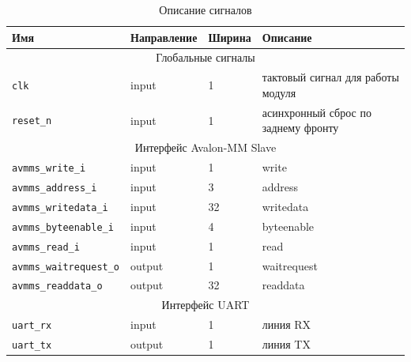 \documentclass[a4paper,12pt]{article}
\begin{document}
    \begin{table}
        \caption{Описание сигналов}
        \begin{center}
            \begin{tabular}{l|l|l|l}
                    \rowcolor[gray]{0.7} Имя & Направление & Ширина & Описание \\ \hline \hline
                    \multicolumn{4}{c}{Глобальные сигналы} \\ \hline
                    \texttt{clk} & input & 1 & тактовый сигнал для работы модуля \\ \hline
                    \texttt{reset\_n} & input & 1 & асинхронный сброс по заднему фронту \\ \hline

                    \multicolumn{4}{c}{Интерфейс Avalon-MM Slave} \\ \hline
                    \texttt{avmms\_write\_i} & input & 1 & write \\ \hline
                    \texttt{avmms\_address\_i} & input & 3 & address \\ \hline
                    \texttt{avmms\_writedata\_i} & input & 32 & writedata \\ \hline
                    \texttt{avmms\_byteenable\_i} & input & 4 & byteenable \\ \hline
                    \texttt{avmms\_read\_i} & input & 1 & read \\ \hline
                    \texttt{avmms\_waitrequest\_o} & output & 1 & waitrequest \\ \hline
                    \texttt{avmms\_readdata\_o} & output & 32 & readdata \\ \hline

                    \multicolumn{4}{c}{Интерфейс UART} \\ \hline
                    \texttt{uart\_rx} & input & 1 & линия RX \\ \hline
                    \texttt{uart\_tx} & output & 1 & линия TX \\ \hline
                    \hline
            \end{tabular}
            \label{tab:descr_singals}
        \end{center}
    \end{table}
\end{document}
